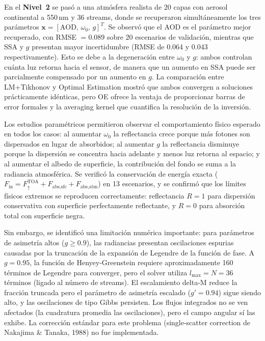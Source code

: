 \documentclass[a4paper,11pt]{article}
\begin{document}
En el \textbf{Nivel~2} se pas\'o a una atm\'osfera realista de 20 capas
con aerosol continental a 550\,nm y 36 streams, donde se recuperaron
simult\'aneamente los tres par\'ametros $\mathbf{x} = [\text{AOD},\,\omega_0,\,g]^T$.
Se observ\'o que el AOD es el par\'ametro mejor recuperado, con
RMSE $= 0.089$ sobre 20 escenarios de validaci\'on, mientras que SSA
y $g$ presentan mayor incertidumbre (RMSE de 0.064 y 0.043
respectivamente). Esto se debe a la degeneraci\'on entre $\omega_0$ y $g$:
ambos controlan cu\'anta luz retorna hacia el sensor, de manera que un
aumento en SSA puede ser parcialmente compensado por un aumento en $g$.
La comparaci\'on entre LM+Tikhonov y Optimal Estimation mostr\'o que ambos
convergen a soluciones pr\'acticamente id\'enticas, pero OE ofrece
la ventaja de proporcionar barras de error formales y la averaging kernel
que cuantifica la resoluci\'on de la inversi\'on.

Los estudios param\'etricos permitieron observar el comportamiento f\'isico
esperado en todos los casos: al aumentar $\omega_0$ la reflectancia crece
porque m\'as fotones son dispersados en lugar de absorbidos; al aumentar
$g$ la reflectancia disminuye porque la dispersi\'on se concentra hacia
adelante y menos luz retorna al espacio; y al aumentar el albedo de
superficie, la contribuci\'on del fondo se suma a la radiancia atmosf\'erica.
Se verific\'o la conservaci\'on de energ\'ia exacta
($F_{\text{in}} = F_\uparrow^{\text{TOA}} + F_{\text{abs,sfc}} + F_{\text{abs,atm}}$)
en 13 escenarios, y se confirm\'o que los l\'imites f\'isicos extremos se
reproducen correctamente: reflectancia $R = 1$ para dispersi\'on
conservativa con superficie perfectamente reflectante, y $R = 0$ para
absorci\'on total con superficie negra.

Sin embargo, se identific\'o una limitaci\'on num\'erica importante: para
par\'ametros de asimetr\'ia altos ($g \geq 0.9$), las radiancias presentan
oscilaciones espurias causadas por la truncaci\'on de la expansi\'on de
Legendre de la funci\'on de fase. A $g = 0.95$, la funci\'on de
Henyey-Greenstein requiere aproximadamente 160 t\'erminos de Legendre para
converger, pero el solver utiliza $l_{\max} = N = 36$ t\'erminos (ligado
al n\'umero de streams). El escalamiento delta-M reduce la fracci\'on truncada
pero el par\'ametro de asimetr\'ia escalado ($g' = 0.94$) sigue siendo alto,
y las oscilaciones de tipo Gibbs persisten. Los flujos integrados no se
ven afectados (la cuadratura promedia las oscilaciones), pero el campo
angular s\'i las exhibe. La correcci\'on est\'andar para este problema
(single-scatter correction de Nakajima \& Tanaka, 1988) no fue implementada.
\end{document}
